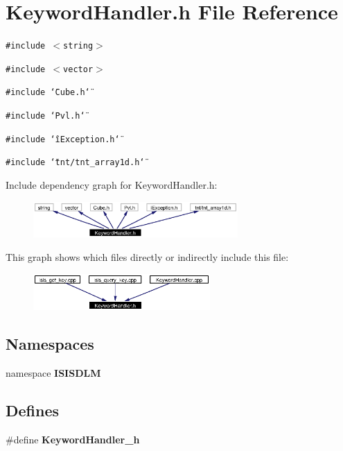 \section{Keyword\-Handler.h File Reference}
\label{KeywordHandler_8h}
{\tt \#include $<$string$>$}\par
{\tt \#include $<$vector$>$}\par
{\tt \#include \char`\"{}Cube.h\char`\"{}}\par
{\tt \#include \char`\"{}Pvl.h\char`\"{}}\par
{\tt \#include \char`\"{}i\-Exception.h\char`\"{}}\par
{\tt \#include \char`\"{}tnt/tnt\_\-array1d.h\char`\"{}}\par


Include dependency graph for Keyword\-Handler.h:\begin{figure}[H]
\begin{center}
\leavevmode
\includegraphics[width=221pt]{KeywordHandler_8h__incl}
\end{center}
\end{figure}


This graph shows which files directly or indirectly include this file:\begin{figure}[H]
\begin{center}
\leavevmode
\includegraphics[width=191pt]{KeywordHandler_8h__dep__incl}
\end{center}
\end{figure}
\subsection*{Namespaces}
\begin{CompactItemize}
\item 
namespace {\bf ISISDLM}
\end{CompactItemize}
\subsection*{Defines}
\begin{CompactItemize}
\item 
\#define {\bf Keyword\-Handler\_\-h}
\end{CompactItemize}



